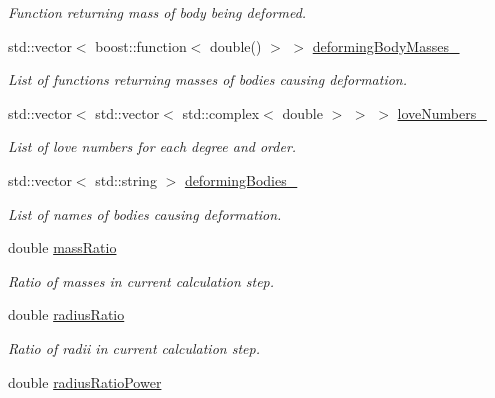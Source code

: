 \begin{DoxyCompactItemize}
\begin{DoxyCompactList}\small\item\em Function returning mass of body being deformed. \end{DoxyCompactList}\item 
std\+::vector$<$ boost\+::function$<$ double() $>$ $>$ \hyperlink{classtudat_1_1gravitation_1_1BasicSolidBodyTideGravityFieldVariations_a001d0bd58615e93f73ec72849d03298d}{deforming\+Body\+Masses\+\_\+}
\begin{DoxyCompactList}\small\item\em List of functions returning masses of bodies causing deformation. \end{DoxyCompactList}\item 
std\+::vector$<$ std\+::vector$<$ std\+::complex$<$ double $>$ $>$ $>$ \hyperlink{classtudat_1_1gravitation_1_1BasicSolidBodyTideGravityFieldVariations_a87a672e14855c8795103eaa4830cf501}{love\+Numbers\+\_\+}
\begin{DoxyCompactList}\small\item\em List of love numbers for each degree and order. \end{DoxyCompactList}\item 
std\+::vector$<$ std\+::string $>$ \hyperlink{classtudat_1_1gravitation_1_1BasicSolidBodyTideGravityFieldVariations_a6da84354b18ad22f89fa49e720dd34a9}{deforming\+Bodies\+\_\+}
\begin{DoxyCompactList}\small\item\em List of names of bodies causing deformation. \end{DoxyCompactList}\item 
double \hyperlink{classtudat_1_1gravitation_1_1BasicSolidBodyTideGravityFieldVariations_a40b77e066ce4933eb7a4d9ca5fd27b76}{mass\+Ratio}
\begin{DoxyCompactList}\small\item\em Ratio of masses in current calculation step. \end{DoxyCompactList}\item 
double \hyperlink{classtudat_1_1gravitation_1_1BasicSolidBodyTideGravityFieldVariations_a6ba4ba751b56f7f653a7370371f5ab21}{radius\+Ratio}
\begin{DoxyCompactList}\small\item\em Ratio of radii in current calculation step. \end{DoxyCompactList}\item 
double \hyperlink{classtudat_1_1gravitation_1_1BasicSolidBodyTideGravityFieldVariations_a6646e9fc25280255248df924c8fcc6ea}{radius\+Ratio\+Power}

\end{DoxyCompactItemize}
